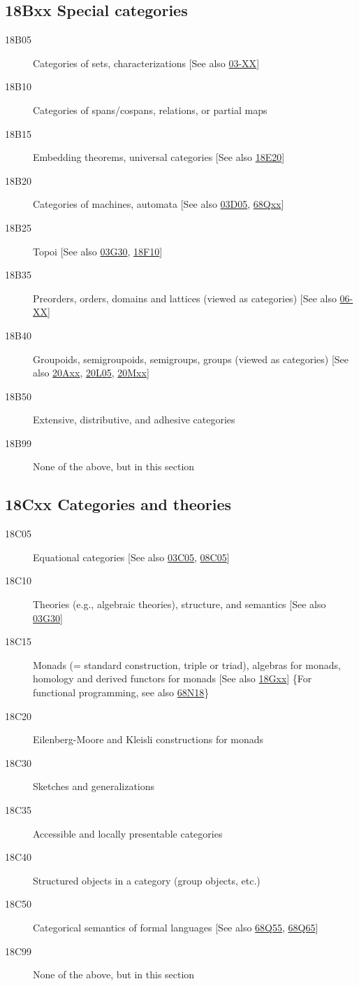 \subsection*{18Bxx  Special categories }\label{18Bxx}
\begin{description}  
\item [18B05]\label{18B05} Categories of sets, characterizations [See also \hyperref[03-XX]{03-XX}]
\item [18B10]\label{18B10} Categories of spans/cospans, relations, or partial maps
\item [18B15]\label{18B15} Embedding theorems, universal categories [See also \hyperref[18E20]{18E20}]
\item [18B20]\label{18B20} Categories of machines, automata [See also \hyperref[03D05]{03D05}, \hyperref[68Qxx]{68Qxx}]
\item [18B25]\label{18B25} Topoi [See also \hyperref[03G30]{03G30}, \hyperref[18F10]{18F10}]
\item [18B35]\label{18B35} Preorders, orders, domains and lattices (viewed as categories) [See also \hyperref[06-XX]{06-XX}]
\item [18B40]\label{18B40} Groupoids, semigroupoids, semigroups, groups (viewed as categories) [See also \hyperref[20Axx]{20Axx}, \hyperref[20L05]{20L05}, \hyperref[20Mxx]{20Mxx}]
\item [18B50]\label{18B50} Extensive, distributive, and adhesive categories
\item [18B99]\label{18B99} None of the above, but in this section
\end{description}
\subsection*{18Cxx  Categories and theories }\label{18Cxx}
\begin{description}  
\item [18C05]\label{18C05} Equational categories [See also \hyperref[03C05]{03C05}, \hyperref[08C05]{08C05}]
\item [18C10]\label{18C10} Theories (e.g., algebraic theories), structure, and semantics [See also \hyperref[03G30]{03G30}]
\item [18C15]\label{18C15} Monads (= standard construction, triple or triad), algebras for monads, homology and derived functors for monads [See also \hyperref[18Gxx]{18Gxx}] \{For functional programming, see also \hyperref[68N18]{68N18}\}
\item [18C20]\label{18C20} Eilenberg-Moore and Kleisli constructions for monads
\item [18C30]\label{18C30} Sketches and generalizations
\item [18C35]\label{18C35} Accessible and locally presentable categories
\item [18C40]\label{18C40} Structured objects in a category (group objects, etc.)
\item [18C50]\label{18C50} Categorical semantics of formal languages [See also \hyperref[68Q55]{68Q55}, \hyperref[68Q65]{68Q65}]
\item [18C99]\label{18C99} None of the above, but in this section
\end{description}
